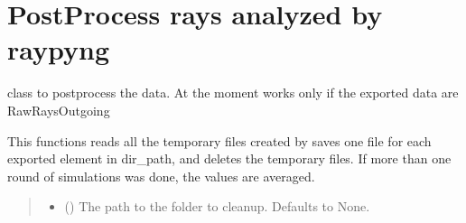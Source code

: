 \documentclass[letterpaper,10pt,english]{sphinxmanual}
\begin{document}
\section{PostProcess rays analyzed by raypyng}
\label{\detokenize{code_documentation:postprocess-rays-analyzed-by-raypyng}}

\begin{fulllineitems}
\label{\detokenize{code_documentation:raypyng.postprocessing.PostProcess}}
\pysigstartsignatures
{}
\pysigstopsignatures
\sphinxAtStartPar
class to post\sphinxhyphen{}process the data.
At the moment works only if the exported data are RawRaysOutgoing

\begin{fulllineitems}
\label{\detokenize{code_documentation:raypyng.postprocessing.PostProcess.cleanup}}
\pysigstartsignatures
{}
\pysigstopsignatures
\sphinxAtStartPar
This functions reads all the temporary files created by 
saves one file for each exported element in dir\_path, and deletes the temporary files.
If more than one round of simulations was done, the values are averaged.
\begin{quote}\begin{description}
\begin{itemize}
\item {} 
\sphinxAtStartPar
{} (\sphinxstyleliteralemphasis{\sphinxupquote{, }}) \textendash{} The path to the folder to cleanup. Defaults to None.


\end{itemize}
\end{description}
\end{quote}
\end{fulllineitems}
\end{fulllineitems}
\end{document}
